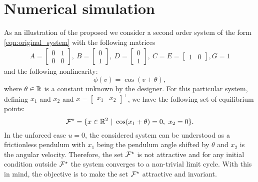 \documentclass{ifacconf}
\begin{document}
\section{Numerical simulation}
As an illustration of the proposed we consider a second order system of the form \eqref{eqn:original_system} with the following matrices
$$
\begin{aligned}
    A = \begin{bmatrix}
        0 & 1\\ 0 & 0
    \end{bmatrix}, \ B = \begin{bmatrix}
        0 \\ 1
    \end{bmatrix}, \ D = \begin{bmatrix}
        0 \\ 1
    \end{bmatrix}, \ C = E= \begin{bmatrix}
        1 & 0
    \end{bmatrix}, G = 1
\end{aligned}
$$
and the following nonlinearity:
$$
\phi(v)=\cos(v+\theta),
$$
where $\theta\in{\mathbb{R}}$ is a constant unknown by the designer. For this particular system, defining $x_1$ and $x_2$ and $x = \begin{bmatrix}
    x_1 & x_2
\end{bmatrix}^\top$, we have the following set of equilibrium points:
$$
{\mathcal{F}}^\star = \{x\in{\mathbb{R}}^2 \ | \ \cos(x_1+\theta)=0, \ x_2 = 0\}.
$$
In the unforced case $u=0$, the considered system can be understood as a frictionless pendulum with $x_1$ being the pendulum angle shifted by $\theta$ and $x_2$ is the angular velocity. Therefore, the set ${\mathcal{F}}^\star$ is not attractive and for any initial condition outside ${\mathcal{F}}^\star$ the system converges to a non-trivial limit cycle. With this in mind, the objective is to make the set ${\mathcal{F}}^\star$ attractive and invariant.
\end{document}
